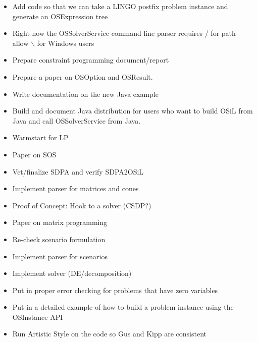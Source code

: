\begin{itemize}
\item Add code so that we can take a LINGO postfix problem instance and generate an OSExpression tree

\item Right now the OSSolverService command line parser requires / for path -- allow {$\backslash$} for Windows users

\item Prepare constraint programming document/report

\item Prepare a paper on OSOption and OSResult.

\item Write documentation on the new Java example 

\item Build and document Java distribution for users who want to build OSiL from Java and 
call OSSolverService from Java. 

\item Warmstart for LP

\item Paper on SOS

\item Vet/finalize SDPA and verify SDPA2OSiL

\item Implement parser for matrices and cones

\item Proof of Concept: Hook to a solver (CSDP?)

\item Paper on matrix programming

\item Re-check scenario formulation

\item Implement parser for scenarios

\item Implement solver (DE/decomposition)

\item Put in proper error checking for problems that have zero variables

\item Put in a detailed example of how to build a problem instance using the OSInstance API

\item Run Artistic Style on the code so Gus and Kipp are consistent

\end{itemize}
